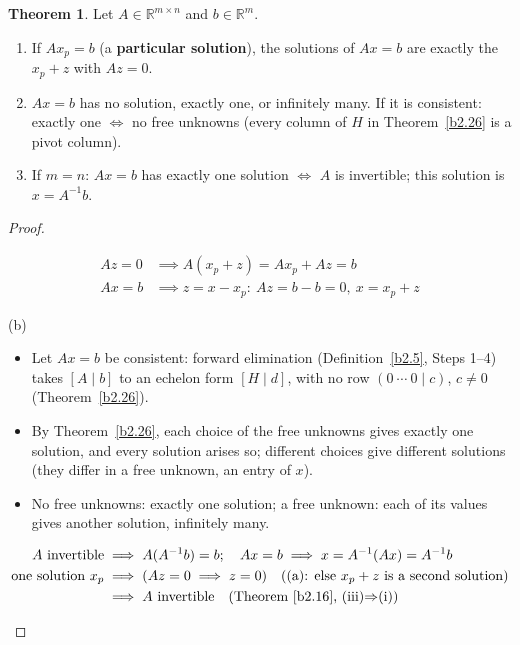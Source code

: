 \documentclass[12pt]{article}
\newcommand{\R}{\mathbb R}
\theoremstyle{definition}
\newtheorem{theorem}{Theorem}
\newcommand{\boardtop}{\vspace*{-\abovedisplayskip}}
\begin{document}
\begin{theorem}\label{b2.27}
Let \(A\in\R^{m\times n}\) and \(b\in\R^m\).
\begin{enumerate}
\item If \(Ax_p=b\) (a \textbf{particular solution}), the solutions of \(Ax=b\) are exactly the \(x_p+z\) with
\(Az=0\).
\item \(Ax=b\) has no solution, exactly one, or infinitely many. If it is consistent: exactly one \(\iff\) no free
unknowns (every column of \(H\) in Theorem~\ref{b2.26} is a pivot column).
\item If \(m=n\): \(Ax=b\) has exactly one solution \(\iff\) \(A\) is invertible; this solution is \(x=A^{-1}b\).
\end{enumerate}
\end{theorem}
\begin{proof}
\begin{board}
\boardtop
\begin{align*}
Az=0&\implies A(x_p+z)=Ax_p+Az=b\\
Ax=b&\implies z=x-x_p:\ Az=b-b=0,\ x=x_p+z
\end{align*}
\end{board}
(b)
\begin{itemize}
\item Let \(Ax=b\) be consistent: forward elimination (Definition~\ref{b2.5}, Steps 1--4) takes \([A\mid b]\) to an
echelon form \([H\mid d]\), with no row \((0\ \cdots\ 0\mid c)\), \(c\ne0\) (Theorem~\ref{b2.26}).
\item By Theorem~\ref{b2.26}, each choice of the free unknowns gives exactly one solution, and every solution arises
so; different choices give different solutions (they differ in a free unknown, an entry of \(x\)).
\item No free unknowns: exactly one solution; a free unknown: each of its values gives another solution, infinitely
many.
\end{itemize}
\begin{board}
\boardtop
\begin{align*}
A\text{ invertible}&\implies A(A^{-1}b)=b;\quad Ax=b\implies x=A^{-1}(Ax)=A^{-1}b\\
\text{one solution }x_p&\implies(Az=0\implies z=0)\quad\text{((a): else \(x_p+z\) is a second solution)}\\
&\implies A\text{ invertible}\quad\text{(Theorem~\ref{b2.16}, (iii)\(\Rightarrow\)(i))}
\end{align*}
\end{board}
\nopagebreak
\end{proof}
\end{document}
